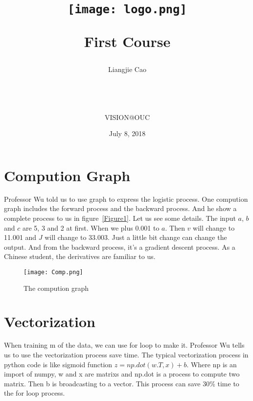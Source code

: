 \documentclass[letterpaper]{article}
\begin{document}
\title{
\begin{figure}[!htb]
 \centering
 \texttt{[image: logo.png]}\\
 \end{figure}First Course}
\author{Liangjie Cao   \\\\\\\\\\ VISION@OUC}
\date{July 8, 2018}
\maketitle
\newpage
\section{Compution Graph}
Professor Wu told us to use graph to express the logistic process. One compution graph includes the forward process and the backward process. And he show a complete process to us in figure~\ref{Figure1}. Let us see some details. The input $a$, $b$ and $c$ are 5, 3 and 2 at first. When we plus 0.001 to $a$. Then $v$ will change to 11.001 and $J$ will change to 33.003. Just a little bit change can change the output. And from the backward process, it's a gradient descent process. As a Chinese student, the derivatives are familiar to us. 
\begin{figure}[!htb]
	\centering
	\texttt{[image: Comp.png]}\\
	\caption{The compution graph}
\end{figure}\label{Figure1}
\section{Vectorization}
When training m of the data, we can use for loop to make it. Professor Wu tells us to use the vectorization process save time. The typical vectorization process in python code is like sigmoid function $z=np.dot(w.T,x)+b$. Where np is an import of numpy, w and x are matrixs and np.dot is a process to compute two matrix. Then b is broadcasting to a vector. This process can save 30\% time to the for loop process. 
\end{document}
